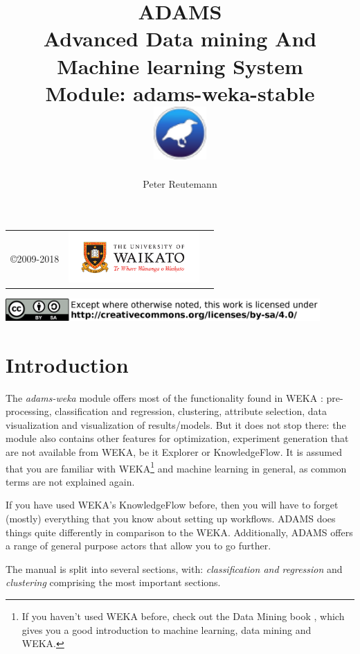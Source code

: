 \documentclass[a4paper]{book}
\title{
  \textbf{ADAMS} \\
  {\Large \textbf{A}dvanced \textbf{D}ata mining \textbf{A}nd \textbf{M}achine
  learning \textbf{S}ystem} \\
  {\Large Module: adams-weka-stable} \\
  \vspace{1cm}
  \includegraphics[width=2cm]{images/weka-stable-module.png} \\
}
\author{
  Peter Reutemann
}
\begin{document}
\begin{titlepage}
\maketitle

\thispagestyle{empty}
\center
\begin{table}[b]
	\begin{tabular}{c l l}
		\parbox[c][2cm]{2cm}{\copyright 2009-2018} &
		\parbox[c][2cm]{5cm}{\includegraphics[width=5cm]{images/coat_of_arms.pdf}} \\
	\end{tabular}
	\includegraphics[width=12cm]{images/cc.png} \\
\end{table}

\end{titlepage}

\tableofcontents
\listoffigures

\chapter{Introduction}
The \textit{adams-weka} module offers most of the functionality found in WEKA
\cite{weka}: pre-processing, classification and regression, clustering,
attribute selection, data visualization and visualization of results/models.
But it does not stop there: the module also contains other features for
optimization, experiment generation that are not available from WEKA, be it
Explorer or KnowledgeFlow. It is assumed that you are familiar with
WEKA\footnote{If you haven't used WEKA before, check out the Data Mining book
\cite{wekabook}, which gives you a good introduction to machine learning, data
mining and WEKA.} and machine learning in general, as common terms are not
explained again.

If you have used WEKA's KnowledgeFlow before, then you will have to forget
(mostly) everything that you know about setting up workflows. ADAMS does things
quite differently in comparison to the WEKA. Additionally, ADAMS offers a range
of general purpose actors that allow you to go further.

The manual is split into several sections, with: \textit{classification and regression}
and \textit{clustering} comprising the most important sections.
















\end{document}
